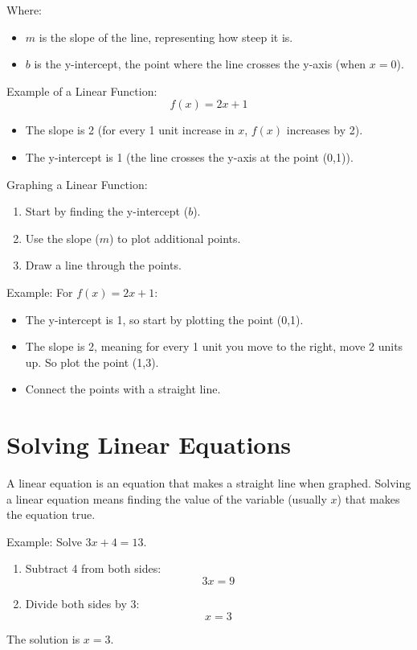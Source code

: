 Where:
\begin{itemize}
    \item \( m \) is the slope of the line, representing how steep it is.
    \item \( b \) is the y-intercept, the point where the line crosses the y-axis (when \( x = 0 \)).
\end{itemize}

Example of a Linear Function:
\[ f(x) = 2x + 1 \]
\begin{itemize}
    \item The slope is 2 (for every 1 unit increase in \( x \), \( f(x) \) increases by 2).
    \item The y-intercept is 1 (the line crosses the y-axis at the point (0,1)).
\end{itemize}

Graphing a Linear Function:
\begin{enumerate}
    \item Start by finding the y-intercept (\( b \)).
    \item Use the slope (\( m \)) to plot additional points.
    \item Draw a line through the points.
\end{enumerate}

Example: For \( f(x) = 2x + 1 \):
\begin{itemize}
    \item The y-intercept is 1, so start by plotting the point (0,1).
    \item The slope is 2, meaning for every 1 unit you move to the right, move 2 units up. So plot the point (1,3).
    \item Connect the points with a straight line.
\end{itemize}

\section{Solving Linear Equations}
A linear equation is an equation that makes a straight line when graphed. Solving a linear equation means finding the value of the variable (usually \( x \)) that makes the equation true.

Example: Solve \( 3x + 4 = 13 \).
\begin{enumerate}
    \item Subtract 4 from both sides:
    \[ 3x = 9 \]
    \item Divide both sides by 3:
    \[ x = 3 \]
\end{enumerate}
The solution is \( x = 3 \).

